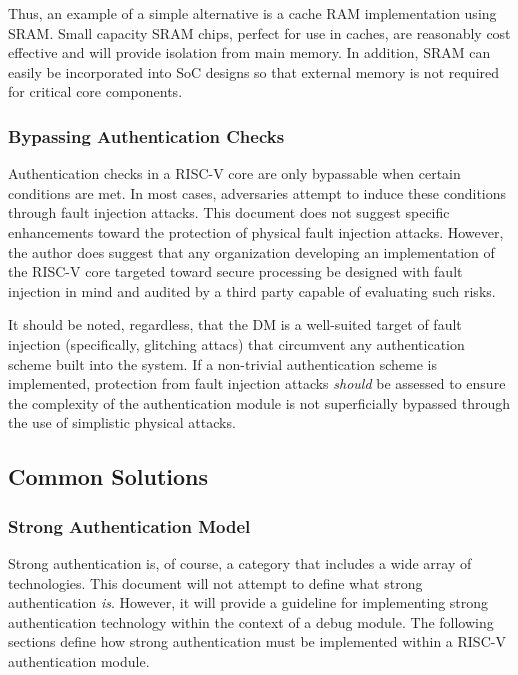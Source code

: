 Thus, an example of a simple alternative is a cache RAM implementation using SRAM. Small capacity SRAM chips, perfect for use in caches, are reasonably cost effective and will provide isolation from main memory. In addition, SRAM can easily be incorporated into SoC designs so that external memory is not required for critical core components. 

\subsubsection{Bypassing Authentication Checks}
Authentication checks in a RISC-V core are only bypassable when certain conditions are met. In most cases, adversaries attempt to induce these conditions through fault injection attacks. This document does not suggest specific enhancements toward the protection of physical fault injection attacks. However, the author does suggest that any organization developing an implementation of the RISC-V core targeted toward secure processing be designed with fault injection in mind and audited by a third party capable of evaluating such risks. 

It should be noted, regardless, that the DM is a well-suited target of fault injection (specifically, glitching attacs) that circumvent any authentication scheme built into the system. If a non-trivial authentication scheme is implemented, protection from fault injection attacks {\em should} be assessed to ensure the complexity of the authentication module is not superficially bypassed through the use of simplistic physical attacks.

\subsection{Common Solutions}

\subsubsection{Strong Authentication Model}
Strong authentication is, of course, a category that includes a wide array of technologies. This document will not attempt to define what strong authentication {\em is}. However, it will provide a guideline for implementing strong authentication technology within the context of a debug module. The following sections define how strong authentication must be implemented within a RISC-V authentication module.

